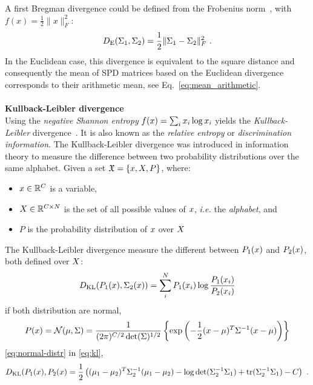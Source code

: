 A first Bregman divergence could be defined from the Frobenius norm~\cite{dhillon_matrix_2007}, with $f(x) = \frac{1}{2} \lVert x \rVert_F^2$:
\begin{equation}
\divB{E}(\P_1, \P_2) = \frac{1}{2}\lVert \P_1-\P_2 \rVert _F^2 \ .
\label{eq:div-eucl}
\end{equation}
In the Euclidean case, this divergence is equivalent to the square distance and consequently the mean of SPD matrices based on the Euclidean divergence corresponds to their arithmetic mean, see Eq.~\eqref{eq:mean_arithmetic}.
\\ \\ \textbf{Kullback-Leibler divergence} \\
Using the \emph{negative Shannon entropy} $f(x) = \sum_{i} x_{i} \log x_{i}$ yields the \emph{Kullback-Leibler} divergence~\cite{nielsen_sided_2009}.
It is also known as the \emph{relative entropy} or \emph{discrimination information}. 
The Kullback-Leibler divergence was introduced in information theory to measure the difference between two probability distributions over the same alphabet.
Given a set $\mathfrak{X} = \left\lbrace x, X, P \right\rbrace$, where:
\begin{itemize}
\item $x \in \mathbb{R}^{C}$ is a variable,
\item $X \in \mathbb{R}^{C \times N}$ is the set of all possible values of $x$, \textit{i.e.} the \emph{alphabet}, and
\item $P$ is the probability distribution of $x$ over $X$ 
\end{itemize}
The Kullback-Leibler divergence measure the different between $P_1(x)$ and $P_2(x)$, both defined over $X$:
\begin{equation}
\divB{KL}(P_1(\x), \P_2(\x)) = \sum_{i}^{\dt} P_1(\x_i) \log \frac{P_1(\x_i)}{P_2(\x_i)}
\label{eq:kl} 
\end{equation}
if both distribution are normal, 
\begin{equation}
P(\x) = \mathcal{N}(\mu, \P) = \frac{1}{(2\pi)^{\dc/2}\det(\P)^{1/2}} \left\lbrace \exp\left( -\frac{1}{2}(\x-\mu)^{T} \P^{-1}(\x-\mu) \right)  \right\rbrace
\label{eq:normal-distr}
\end{equation}
\eqref{eq:normal-distr} in \eqref{eq:kl},
\begin{equation}
\divB{KL}(P_1(\x), P_2(\x) = \frac{1}{2} \left( (\mu_1-\mu_2)^T \P_2^{-1}(\mu_1-\mu_2) - \log \det (\P_2^{-1}\P_1) + \tr(\P_2^{-1} \P_1) - \dc \right) \ .
\label{eq:div-kl-gen}
\end{equation}
